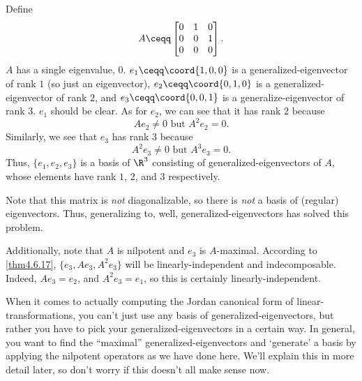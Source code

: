 \begin{exm}{}{}
	Define
	\begin{equation}
		A\ceqq \begin{bmatrix}0 & 1 & 0 \\ 0 & 0 & 1 \\ 0 & 0 & 0\end{bmatrix}.
	\end{equation}
	$A$ has a single eigenvalue, $0$.  $e_1\ceqq \coord{1,0,0}$ is a generalized-eigenvector of rank $1$ (so just an eigenvector), $e_2\ceqq \coord{0,1,0}$ is a generalized-eigenvector of rank $2$, and $e_3\ceqq \coord{0,0,1}$ is a generalize-eigenvector of rank $3$.  $e_1$ should be clear.  As for $e_2$, we can see that it has rank $2$ because
	\begin{equation}
		Ae_2\neq 0\text{ but }A^2e_2=0.
	\end{equation}
	Similarly, we see that $e_3$ has rank $3$ because
	\begin{equation}
		A^2e_3\neq 0\text{ but }A^3e_3=0.
	\end{equation}
	Thus, $\{ e_1,e_2,e_3\}$ is a basis of $\R ^3$ consisting of generalized-eigenvectors of $A$, whose elements have rank $1$, $2$, and $3$ respectively.
	
	Note that this matrix is \emph{not} diagonalizable, so there is \emph{not} a basis of (regular) eigenvectors.  Thus, generalizing to, well, generalized-eigenvectors has solved this problem.
	
	Additionally, note that $A$ is nilpotent and $e_3$ is $A$-maximal.  According to \cref{thm4.6.17}, $\{ e_3,Ae_3,A^2e_3\}$ will be linearly-independent and indecomposable.  Indeed, $Ae_3=e_2$, and $A^2e_3=e_1$, so this is certainly linearly-independent.
	
	When it comes to actually computing the Jordan canonical form of linear-transformations, you can't just use any basis of generalized-eigenvectors, but rather you have to pick your generalized-eigenvectors in a certain way.  In general, you want to find the ``maximal'' generalized-eigenvectors and `generate' a basis by applying the nilpotent operators as we have done here.  We'll explain this in more detail later, so don't worry if this doesn't all make sense now.
\end{exm}
